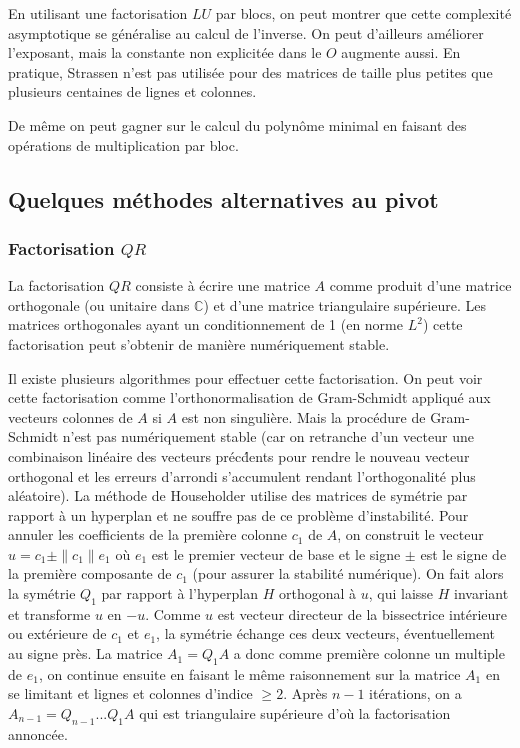 \documentclass[a4paper,11pt]{article}
\newcommand{\C}{{\mathbb{C}}}
\begin{document}
\begin{giacjshere}
En utilisant une factorisation $LU$ par blocs, on peut montrer
que cette complexit\'e asymptotique se g\'en\'eralise au
calcul de l'inverse. On peut d'ailleurs am\'eliorer l'exposant,
mais la constante non explicit\'ee dans le $O$ augmente aussi.
En pratique, Strassen n'est pas utilis\'ee pour des matrices
de taille plus petites que plusieurs centaines de lignes et colonnes.

De m\^eme on peut gagner sur le calcul du polyn\^ome minimal en
faisant des op\'erations de multiplication par bloc.

\subsection{Quelques m\'ethodes alternatives au pivot}
\subsubsection{Factorisation $QR$}
La factorisation $QR$ 
consiste à écrire une matrice $A$ comme produit d'une matrice
orthogonale (ou unitaire dans $\C$) et d'une matrice triangulaire
supérieure. Les matrices orthogonales ayant un conditionnement
de 1 (en norme $L^2$) cette factorisation peut s'obtenir de mani\`ere 
numériquement stable.

Il existe plusieurs algorithmes pour effectuer cette factorisation.
On peut voir cette factorisation comme l'orthonormalisation de
Gram-Schmidt appliqu\'e aux vecteurs colonnes de $A$ si $A$ est non 
singuli\`ere. Mais la proc\'edure de Gram-Schmidt n'est pas
num\'eriquement stable (car on retranche d'un vecteur
une combinaison lin\'eaire des vecteurs pr\'ec\'dents pour rendre
le nouveau vecteur orthogonal et les erreurs d'arrondi s'accumulent
rendant l'orthogonalit\'e plus al\'eatoire).
La m\'ethode de Householder utilise des matrices de sym\'etrie
par rapport \`a un hyperplan et ne souffre pas de ce probl\`eme d'instabilit\'e.
Pour annuler les coefficients de la premi\`ere colonne $c_1$ de $A$,
on construit le vecteur $u=c_1 \pm \|c_1\| e_1$ o\`u $e_1$
est le premier vecteur de base et le signe $\pm$ est
le signe de la premi\`ere composante de $c_1$ (pour assurer
la stabilit\'e num\'erique). On fait alors la sym\'etrie $Q_1$ par rapport
\`a l'hyperplan $H$ orthogonal \`a $u$, qui laisse $H$ invariant
et transforme $u$ en $-u$. Comme $u$ est vecteur directeur
de la bissectrice int\'erieure ou ext\'erieure de $c_1$ et $e_1$, la sym\'etrie
\'echange ces deux vecteurs, \'eventuellement au signe pr\`es.
La matrice $A_1=Q_1A$ a donc comme premi\`ere colonne un multiple de
$e_1$, on continue ensuite en faisant le m\^eme raisonnement
sur la matrice $A_1$ en se limitant et lignes et colonnes d'indice
$\geq 2$. Apr\`es $n-1$ it\'erations, on a $A_{n-1}=Q_{n-1}...Q_1A$
qui est triangulaire sup\'erieure d'o\`u la factorisation annonc\'ee.


\end{giacjshere}
\end{document}
